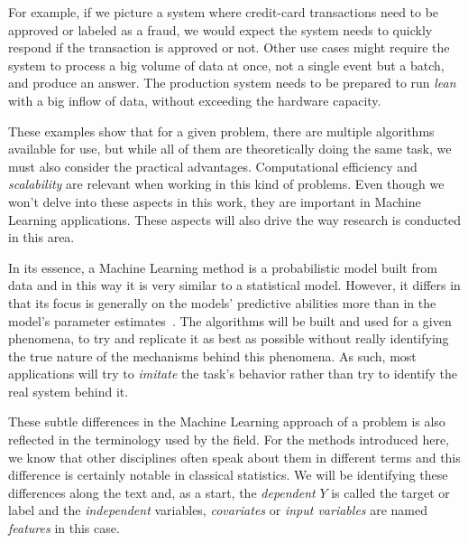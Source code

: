 For example, if we picture a system where credit-card transactions need to be approved or labeled as a fraud, we would expect the system needs to quickly respond if the transaction is approved or not.
Other use cases might require the system to process a big volume of data at once, not a single event but a batch, and produce an answer.
The production system needs to be prepared to run \textit{lean} with a big inflow of data, without exceeding the hardware capacity.

These examples show that for a given problem, there are multiple algorithms available for use, but while all of them are theoretically doing the same task, we must also consider the practical advantages.
Computational efficiency and \textit{scalability} are relevant when working in this kind of problems.
Even though we won't delve into these aspects in this work, they are important in Machine Learning applications.
These aspects will also drive the way research is conducted in this area.


In its essence, a Machine Learning method is a probabilistic model built from data and in this way it is very similar to a statistical model.
However, it differs in that its focus is generally on the models' predictive abilities more than in the model's parameter estimates~\citep{breiman-statisticalmodeling}.
The algorithms will be built and used for a given phenomena, to try and replicate it as best as possible without really identifying the true nature of the mechanisms behind this phenomena.
As such, most applications will try to \textit{imitate} the task's behavior rather than try to identify the real system behind it.


These subtle differences in the Machine Learning approach of a problem is also reflected in the terminology used by the field.
For the methods introduced here, we know that other disciplines often speak about them in different terms and this difference is certainly notable in classical statistics.
We will be identifying these differences along the text and, as a start, the \textit{dependent} $Y$ is called the target or label and the \textit{independent} variables, \textit{covariates} or \textit{input variables} are named \textit{features} in this case.

